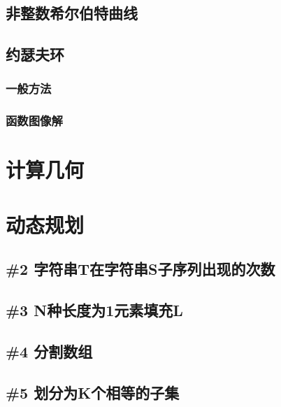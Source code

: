 \documentclass[landscape,twocolumn,twoside,a4paper]{article}
\begin{document}
\subsection{非整数希尔伯特曲线}


\subsection{约瑟夫环}
\subsubsection{一般方法}

\subsubsection{函数图像解}


\section{计算几何}


\section{动态规划}

\subsection{\#2 字符串T在字符串S子序列出现的次数}


\subsection{\#3 N种长度为1元素填充L}


\subsection{\#4 分割数组}


\subsection{\#5 划分为K个相等的子集}

\end{document}
